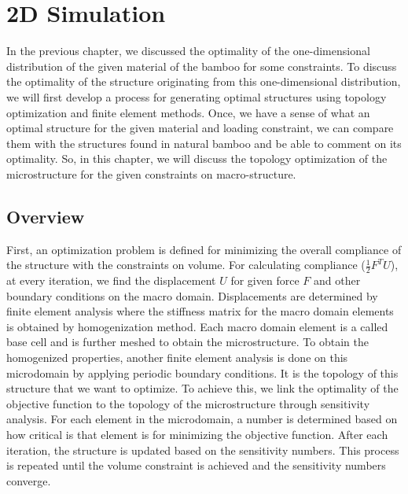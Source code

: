 \documentclass[10pt]{article}
\begin{document}
\newpage
\section{2D Simulation}
In the previous chapter, we discussed the optimality of the one-dimensional distribution of the given material of the bamboo for some constraints. To discuss the optimality of the structure originating from this one-dimensional distribution, we will first develop a process for generating optimal structures using topology optimization and finite element methods. Once, we have a sense of what an optimal structure for the given material and loading constraint, we can compare them with the structures found in natural bamboo and be able to comment on its optimality. So, in this chapter, we will discuss the topology optimization of the microstructure for the given constraints on macro-structure.
\par

\subsection{Overview}
First, an optimization problem is defined for minimizing the overall compliance of the structure with the constraints on volume. For calculating compliance ($\frac{1}{2}F^TU$), at every iteration, we find the displacement $U$ for given force $F$ and other boundary conditions on the macro domain. Displacements are determined by finite element analysis where the stiffness matrix for the macro domain elements is obtained by homogenization method. Each macro domain element is a called base cell and is further meshed to obtain the microstructure. To obtain the homogenized properties, another finite element analysis is done on this microdomain by applying periodic boundary conditions. It is the topology of this structure that we want to optimize. To achieve this, we link the optimality of the objective function to the topology of the microstructure through sensitivity analysis. For each element in the microdomain, a number is determined based on how critical is that element is for minimizing the objective function. After each iteration, the structure is updated based on the sensitivity numbers. This process is repeated until the volume constraint is achieved and the sensitivity numbers converge.
\end{document}
